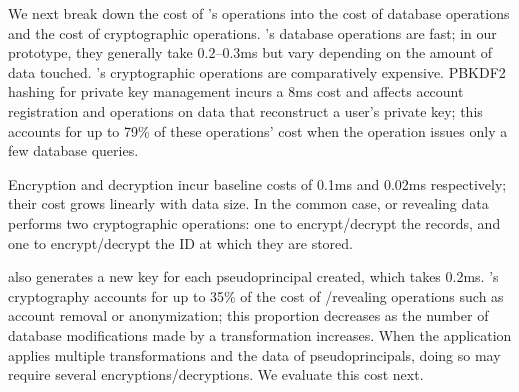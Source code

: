 We next break down the cost of \sys's operations into the cost of database
operations and the cost of cryptographic operations.
%
%
%
\sys's database operations are fast; in our prototype, they generally take
$0.2$--$0.3$ms but vary depending on the amount of data touched.
%
%
\sys's cryptographic operations are comparatively expensive.
%
PBKDF2 hashing for private key management incurs a 8ms cost and affects account
registration and operations on \xxed data that reconstruct a user's private key;
this accounts for up to 79\% of these operations' cost when the operation issues
only a few database queries.
%
%
%

Encryption and decryption incur baseline costs of 0.1ms and 0.02ms respectively;
their cost grows linearly with data size.
%
In the common case, \xxing or revealing data performs two cryptographic
operations: one to encrypt/decrypt the \xx records, and one to
encrypt/decrypt the ID at which they are stored.
%

\sys also generates a new key for each pseudoprincipal created, which takes
0.2ms.
\sys's cryptography accounts for up to 35\%
of the cost of \xxing/revealing operations such as account removal or
anonymization; this proportion decreases as the number of database
modifications made by a transformation increases.
%
When the application applies multiple \xxing transformations and \xxs the
data of pseudoprincipals, doing so may require several encryptions/decryptions.
%
We evaluate this cost next.
%

